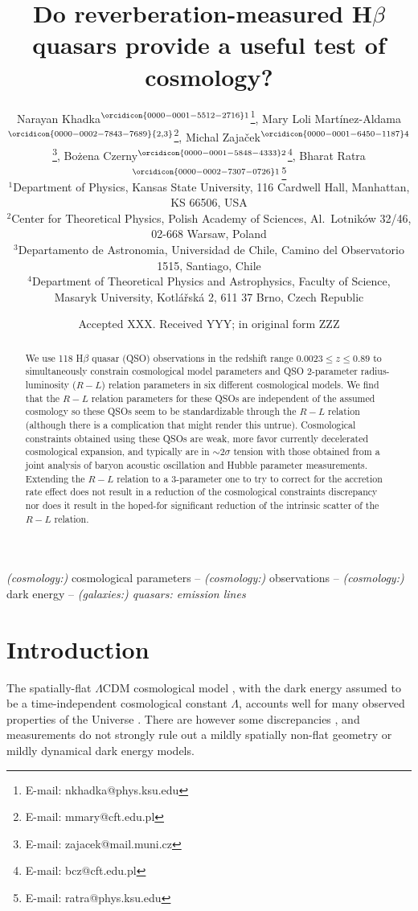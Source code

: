\documentclass[a4paper,fleqn,usenatbib]{mnras}
\title[H$\beta$ QSO study]{Do reverberation-measured H$\beta$ quasars provide a useful test of cosmology?}
\author[]{
Narayan Khadka$^{\orcidicon{0000-0001-5512-2716}1}$\thanks{E-mail: nkhadka@phys.ksu.edu},
Mary Loli Mart\'inez-Aldama$^{\orcidicon{0000-0002-7843-7689}{2,3}}$\thanks{E-mail: mmary@cft.edu.pl},
Michal Zaja\v{c}ek$^{\orcidicon{0000-0001-6450-1187}4}$\thanks{E-mail: zajacek@mail.muni.cz},
\newauthor \hspace{0.1mm}
Bo\.{z}ena Czerny$^{\orcidicon{0000-0001-5848-4333}2}$\thanks{E-mail: bcz@cft.edu.pl},
Bharat Ratra$^{\orcidicon{0000-0002-7307-0726}1}$\thanks{E-mail: ratra@phys.ksu.edu}\\
$^{1}$Department of Physics, Kansas State University, 116 Cardwell Hall, Manhattan, KS 66506, USA\\
$^{2}$Center for Theoretical Physics, Polish Academy of Sciences, Al.\ Lotnik\'{o}w 32/46, 02-668 Warsaw, Poland\\
$^{3}$Departamento de Astronomia, Universidad de Chile, Camino del Observatorio 1515, Santiago, Chile\\
$^{4}$Department of Theoretical Physics and Astrophysics, Faculty of Science, Masaryk University, Kotl\'a\v{r}sk\'a 2, 611 37 Brno, Czech Republic
}
\date{Accepted XXX. Received YYY; in original form ZZZ}
\begin{document}
\label{firstpage}
\pagerange{\pageref{firstpage}--\pageref{lastpage}}
\maketitle

\begin{abstract}
We use 118 H$\beta$ quasar (QSO) observations in the redshift range $0.0023 \leq z \leq 0.89$ to simultaneously constrain cosmological model parameters and QSO 2-parameter radius-luminosity ($R-L$) relation parameters in six different cosmological models. We find that the $R-L$ relation parameters for these QSOs are independent of the assumed cosmology so these QSOs seem to be standardizable through the $R-L$ relation (although there is a complication that might render this untrue). Cosmological constraints obtained using these QSOs are weak, more favor currently decelerated cosmological expansion, and typically are in $\sim 2\sigma$ tension with those obtained from a joint analysis of baryon acoustic oscillation and Hubble parameter measurements. Extending the $R-L$ relation to a 3-parameter one to try to correct for the accretion rate effect does not result in a reduction of the cosmological constraints discrepancy nor does it result in the hoped-for significant reduction of the intrinsic scatter of the $R-L$ relation.  
\end{abstract}

\begin{keywords}
\textit{(cosmology:)} cosmological parameters -- \textit{(cosmology:)} observations -- \textit{(cosmology:)} dark energy -- \textit{(galaxies:) quasars: emission lines}
\end{keywords}



\section{Introduction}
\label{sec:Introduction}

The spatially-flat $\Lambda$CDM cosmological model \citep{Peebles1984}, with the dark energy assumed to be a time-independent cosmological constant $\Lambda$, accounts well for many observed properties of the Universe \citep[see e.g.][]{Farooqetal2017, Scolnicetal2018, PlanckCollaboration2020, eBOSSCollaboration2021}. There are however some discrepancies \citep[see e.g.][]{eleonora2021, PerivolaropoulosSkara2021}, and measurements do not strongly rule out a mildly spatially non-flat geometry or mildly dynamical dark energy models.
\end{document}
